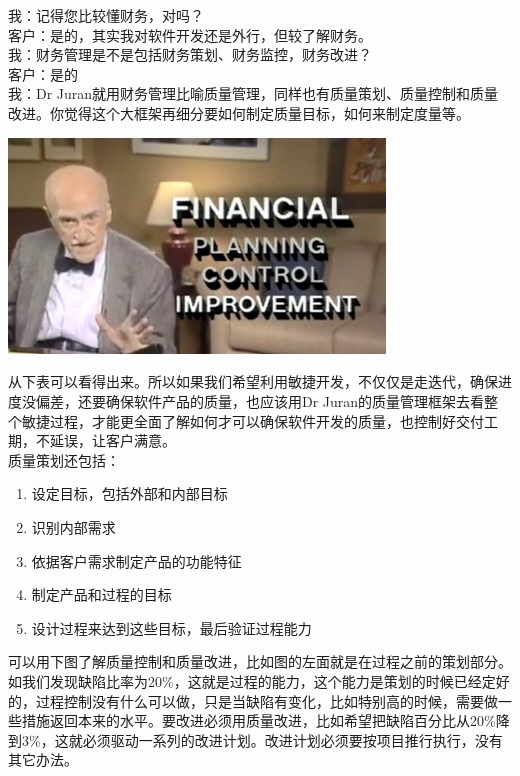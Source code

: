 \documentclass{book}        %
\providecommand{\tightlist}{%
  \setlength{\itemsep}{0pt}\setlength{\parskip}{0pt}}
\begin{document}
我：记得您比较懂财务，对吗？\\
客户：是的，其实我对软件开发还是外行，但较了解财务。\\
我：财务管理是不是包括财务策划、财务监控，财务改进？\\
客户：是的\\
我：Dr
Juran就用财务管理比喻质量管理，同样也有质量策划、质量控制和质量改进。你觉得这个大框架再细分要如何制定质量目标，如何来制定度量等。


\includegraphics[width=10cm]{finAnalogyScreenshot_2022-10-07_212149.jpg}

从下表可以看得出来。所以如果我们希望利用敏捷开发，不仅仅是走迭代，确保进度没偏差，还要确保软件产品的质量，也应该用Dr
Juran的质量管理框架去看整个敏捷过程，才能更全面了解如何才可以确保软件开发的质量，也控制好交付工期，不延误，让客户满意。\\
质量策划还包括：

\begin{enumerate}
\tightlist
\item
  设定目标，包括外部和内部目标
\item
  识别内部需求
\item
  依据客户需求制定产品的功能特征
\item
  制定产品和过程的目标
\item
  设计过程来达到这些目标，最后验证过程能力\\
\end{enumerate}

可以用下图了解质量控制和质量改进，比如图的左面就是在过程之前的策划部分。如我们发现缺陷比率为20\%，这就是过程的能力，这个能力是策划的时候已经定好的，过程控制没有什么可以做，只是当缺陷有变化，比如特别高的时候，需要做一些措施返回本来的水平。要改进必须用质量改进，比如希望把缺陷百分比从20\%降到3\%，这就必须驱动一系列的改进计划。改进计划必须要按项目推行执行，没有其它办法。\\
\end{document}
